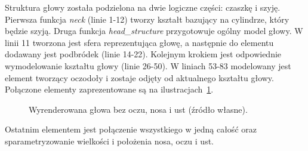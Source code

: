 Struktura głowy została podzielona na dwie logiczne części: czaszkę i
szyję. Pierwsza funkcja {\em neck} (linie 1-12) tworzy kształt bazujący na
cylindrze, który będzie szyją. Druga funkcja {\em head\_structure}
przygotowuje ogólny model głowy. W linii 11 tworzona jest sfera reprezentująca
głowę, a następnie do elementu dodawany jest podbródek (linie 14-22).
Kolejnym krokiem jest odpowiednie wymodelowanie kształtu głowy (linie 26-50).
W liniach 53-83 modelowany jest element tworzący oczodoły i zostaje odjęty od
aktualnego kształtu głowy.
Połączone elementy zaprezentowane są na ilustracjach~\ref{skull}.

\begin{figure}[h!]
  \centering
  \qquad
  \caption{Wyrenderowana głowa bez oczu, nosa i ust (źródło własne).}
  \label{skull}
\end{figure}

Ostatnim elementem jest połączenie wszystkiego w jedną całość oraz
sparametryzowanie wielkości i położenia nosa, oczu i ust.


